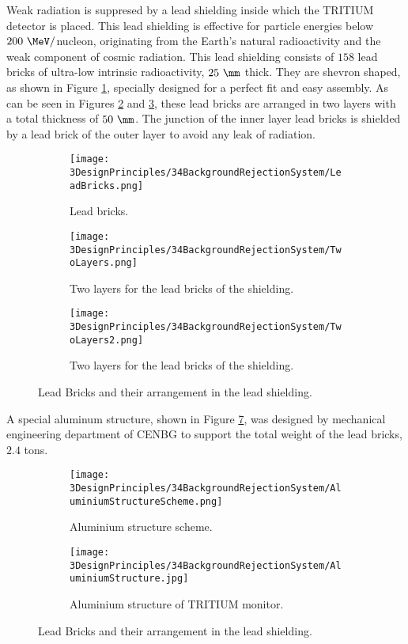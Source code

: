 Weak radiation is suppresed by a lead shielding inside which the TRITIUM detector is placed. This lead shielding is effective for particle energies below $200~\MeV/$nucleon, originating from the Earth's natural radioactivity and the weak component of cosmic radiation. This lead shielding consists of $158$ lead bricks of ultra-low intrinsic radioactivity, $25~\mm$ thick. They are shevron shaped, as shown in Figure \ref{subfig:LeadBricks}, specially designed for a perfect fit and easy assembly. As can be seen in Figures \ref{subfig:TwoLayers} and \ref{subfig:TwoLayers2}, these lead bricks are arranged in two layers with a total thickness of $50~\mm$. The junction of the inner layer lead bricks is shielded by a lead brick of the outer layer to avoid any leak of radiation.

\begin{figure}[h]
\centering
    \begin{subfigure}[b]{0.3\textwidth}
    \centering
    \texttt{[image: 3DesignPrinciples/34BackgroundRejectionSystem/LeadBricks.png]}  
    \caption{Lead bricks.\label{subfig:LeadBricks}}
    \end{subfigure}
    \hfill
    \begin{subfigure}[b]{0.3\textwidth}
    \centering
    \texttt{[image: 3DesignPrinciples/34BackgroundRejectionSystem/TwoLayers.png]}  
    \caption{Two layers for the lead bricks of the shielding.\label{subfig:TwoLayers}}
    \end{subfigure}
    \hfill
    \begin{subfigure}[b]{0.3\textwidth}
    \centering
    \texttt{[image: 3DesignPrinciples/34BackgroundRejectionSystem/TwoLayers2.png]}  
    \caption{Two layers for the lead bricks of the shielding.\label{subfig:TwoLayers2}}
    \end{subfigure}
 \caption{Lead Bricks and their arrangement in the lead shielding.}
 \label{fig:LeadBricksAndArrangement}
\end{figure}

A special aluminum structure, shown in Figure \ref{fig:AluminiumStructure}, was designed by mechanical engineering department of CENBG to support the total weight of the lead bricks, $2.4$ tons.

\begin{figure}
\centering
    \begin{subfigure}[b]{0.45\textwidth}
    \centering
    \texttt{[image: 3DesignPrinciples/34BackgroundRejectionSystem/AluminiumStructureScheme.png]}  
    \caption{Aluminium structure scheme.\label{subfig:AluminiumStructureScheme}}
    \end{subfigure}
    \hfill
    \begin{subfigure}[b]{0.4\textwidth}
    \centering
    \texttt{[image: 3DesignPrinciples/34BackgroundRejectionSystem/AluminiumStructure.jpg]}  
    \caption{Aluminium structure of TRITIUM monitor.\label{subfig:AluminiumStructure}}
    \end{subfigure}
    \caption{Lead Bricks and their arrangement in the lead shielding.}
 \label{fig:AluminiumStructure}
\end{figure}

